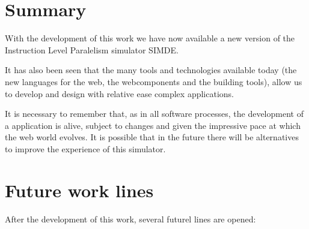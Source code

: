 
\section{Summary}
\label{8:sec:1}

With the development of this work we have now available a new version of
the Instruction Level Paralelism simulator SIMDE.

\bigskip
It has also been seen that the many tools and technologies available today (the new languages 
for the web, the webcomponents and the building tools), allow us to develop 
and design with relative ease complex applications.

\bigskip
It is necessary to remember that, as in all software processes, the development of a
application is alive, subject to changes and given the impressive pace at which the web world evolves.
It is possible that in the future there will be alternatives to improve the experience of this simulator.

\section{Future work lines}
\label{8:sec:2}

After the development of this work, several futurel lines are opened: 

